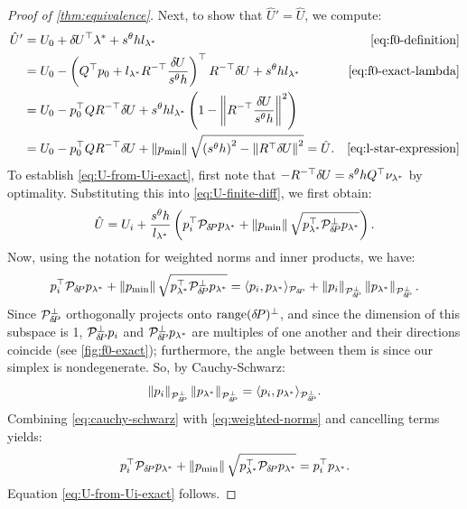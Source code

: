 \documentclass{article}
\begin{document}
\begin{proof}[Proof of \cref{thm:equivalence}]
  Next, to show that $\hat{U}' = \hat{U}$, we compute:
  \begin{align*}
    \hat{U}'
    &= U_0 + \delU^\top \lambda^* + s^\theta h l_{\lambda^*} & \cref{eq:f0-definition} \\
    &= U_0 - \parens{Q^\top p_0 + l_{\lambda^*} R^{-\top} \frac{\delU}{s^\theta h}}^\top R^{-\top} \delU + s^\theta h l_{\lambda^*} & \cref{eq:f0-exact-lambda} \\
    &= U_0 - p_0^\top Q R^{-\top} \delU + s^\theta h l_{\lambda^*} \parens{1 - \norm{R^{-\top} \frac{\delU}{s^\theta h}}^2} \\
    &= U_0 - p_0^\top Q R^{-\top} \delU + \norm{\pmin} \sqrt{\parens{s^\theta h}^2 - \norm{R^\top \delU}^2} = \hat{U}. & \cref{eq:l-star-expression}
  \end{align*}
  To establish \cref{eq:U-from-Ui-exact}, first note that
  $-R^{-\top} {\delta \hspace{-0.09em} U} = s^\theta h Q^\top \nu_{\lambda^*}$ by
  optimality. Substituting this into \cref{eq:U-finite-diff}, we first
  obtain:
  \begin{equation}
    \hat{U} = U_i + \frac{s^\theta h}{l_{\lambda^*}} \left(p_i^\top \mathcal{P}_{{\delta \hspace{-0.14em} P}} p_{\lambda^*} + \left\|p_{\operatorname{min}}\right\| \sqrt{p_{\lambda^*}^\top \mathcal{P}^\perp_{{\delta \hspace{-0.14em} P}} p_{\lambda^*}}\right).
  \end{equation}
  Now, using the notation for weighted norms and inner products, we have:
  \begin{equation}\label{eq:weighted-norms}
    p_i^\top \mathcal{P}_{{\delta \hspace{-0.14em} P}} p_{\lambda^*} + \left\|p_{\operatorname{min}}\right\| \sqrt{p_{\lambda^*}^\top \mathcal{P}^\perp_{{\delta \hspace{-0.14em} P}} p_{\lambda^*}} = \langle p_i, p_{\lambda^*} \rangle_{\mathcal{P}_{{\delta \hspace{-0.14em} P}}} + \left\|p_i\right\|_{\mathcal{P}^\perp_{{\delta \hspace{-0.14em} P}}} \left\|p_{\lambda^*}\right\|_{\mathcal{P}^\perp_{{\delta \hspace{-0.14em} P}}}.
  \end{equation}
  Since $\mathcal{P}^\perp_{{\delta \hspace{-0.14em} P}}$ orthogonally projects onto
  $\operatorname{range}({\delta \hspace{-0.14em} P})^\perp$, and since the dimension of this subspace is
  1, $\mathcal{P}^\perp_{{\delta \hspace{-0.14em} P}} p_i$ and
  $\mathcal{P}^\perp_{{\delta \hspace{-0.14em} P}} p_{\lambda^*}$ are multiples of one
  another and their directions coincide (see \cref{fig:f0-exact});
  furthermore, the angle between them is since our simplex is
  nondegenerate. So, by Cauchy-Schwarz:
  \begin{equation}\label{eq:cauchy-schwarz}
    \left\|p_i\right\|_{\mathcal{P}^\perp_{{\delta \hspace{-0.14em} P}}} \left\|p_{\lambda^*}\right\|_{\mathcal{P}^\perp_{{\delta \hspace{-0.14em} P}}} = \langle p_i, p_{\lambda^*} \rangle_{\mathcal{P}^\perp_{{\delta \hspace{-0.14em} P}}}.
  \end{equation}
  Combining \cref{eq:cauchy-schwarz} with \cref{eq:weighted-norms} and
  cancelling terms yields:
  \begin{equation}
    p_i^\top \mathcal{P}_{{\delta \hspace{-0.14em} P}} p_{\lambda^*} + \left\|p_{\operatorname{min}}\right\| \sqrt{p_{\lambda^*}^\top \mathcal{P}_{{\delta \hspace{-0.14em} P}} p_{\lambda^*}} = p_i^\top p_{\lambda^*}.
  \end{equation}
  Equation \cref{eq:U-from-Ui-exact} follows.


\end{proof}
\end{document}
